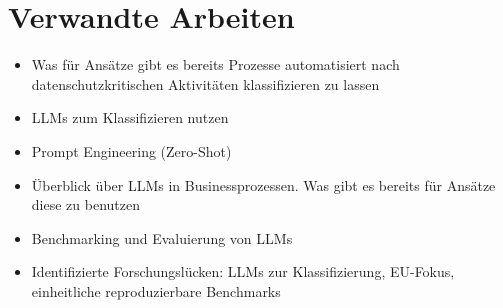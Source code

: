 \section{Verwandte Arbeiten}\label{sec:verwandte-arbeiten}

\begin{itemize}
    \item Was für Ansätze gibt es bereits Prozesse automatisiert nach datenschutzkritischen Aktivitäten klassifizieren zu lassen
    \item LLMs zum Klassifizieren nutzen
    \item Prompt Engineering (Zero-Shot)
    \item Überblick über LLMs in Businessprozessen. Was gibt es bereits für Ansätze diese zu benutzen
    \item Benchmarking und Evaluierung von LLMs
    \item Identifizierte Forschungslücken: LLMs zur Klassifizierung, EU-Fokus, einheitliche reproduzierbare Benchmarks
\end{itemize}